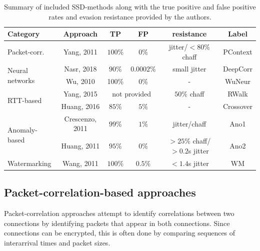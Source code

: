 \documentclass[runningheads]{llncs}\usepackage[]{graphicx}\usepackage[]{color}
\begin{document}
\begin{table}
\centering
\begin{tabular}{l|c|c|c|c|c}
Category & Approach & TP & FP & resistance & Label\\ \hline

Packet-corr. & Yang, 2011 \cite{yang2011correlating} & $100\%$ & $0\%$& jitter/$<80\%$ chaff & PContext\\ \hline

\multirow{2}{*}{Neural networks} & Nasr, 2018 \cite{nasr2018deepcorr} &$90\%$ & $0.0002\%$& small jitter & DeepCorr\\ \cline{2-6}
 
 & Wu, 2010 \cite{wu2010neural} & 100\% & 0\% & - & WuNeur\\ \hline
 
\multirow{2}{*}{RTT-based} & Yang, 2015 \cite{yang2015rtt}& \multicolumn{2}{c|}{not provided} & $50\%$ chaff &RWalk\\ \cline{2-6}

& Huang, 2016 \cite{huang2016detecting} & $85\%$ & $5\%$ & - & Crossover\\ \hline
 
\multirow{2}{*}{Anomaly-based} & Crescenzo, 2011 \cite{di2011detecting} & $99\%$ & $1\%$ & jitter/chaff &Ano1\\ \cline{2-6}

& Huang, 2011 \cite{huang2011detecting,ding2013detecting} & $95\%$ & $0\%$ & $>25\%$ chaff/ $>0.2$s jitter &Ano2\\ \hline

Watermarking & Wang, 2011 \cite{wang2010robust} & $100\%$ & $0.5\%$ &  $<1.4$s jitter & WM\\ \hline
\end{tabular}
\caption{Summary of included SSD-methods along with the true positive and false positive rates and evasion resistance provided by the authors. }\label{Tab:Summary}
\end{table}




\subsection{Packet-correlation-based approaches}

Packet-correlation approaches attempt to identify correlations between two connections by identifying packets that appear in both connections. Since connections can be encrypted, this is often done by comparing sequences of interarrival times and packet sizes.
\end{document}
